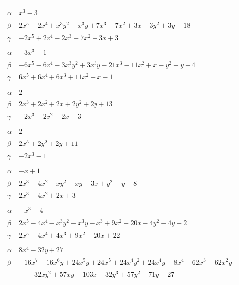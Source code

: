 \documentclass[11pt]{article}
\begin{document}
\begin{longtable}{@{}ll@{}}
\addlinespace[3pt]
\multicolumn{2}{@{}l}{$\{i,j\}=\{2,24\}$, $k_{ij}=2^{2}\cdot 3$}\\
$\alpha$ & $x^{3}-3$\\
$\beta$ & $2x^{5}-2x^{4}+x^{3}y^{2}-x^{3}y+7x^{3}-7x^{2}+3x-3y^{2}+3y-18$\\
$\gamma$ & $-2x^{5}+2x^{4}-2x^{3}+7x^{2}-3x+3$\\
\addlinespace[3pt]
\multicolumn{2}{@{}l}{$\{i,j\}=\{2,37\}$, $k_{ij}=2^{2}$}\\
$\alpha$ & $-3x^{3}-1$\\
$\beta$ & $-6x^{5}-6x^{4}-3x^{3}y^{2}+3x^{3}y-21x^{3}-11x^{2}+x-y^{2}+y-4$\\
$\gamma$ & $6x^{5}+6x^{4}+6x^{3}+11x^{2}-x-1$\\
\addlinespace[3pt]
\multicolumn{2}{@{}l}{$\{i,j\}=\{3,11\}$, $k_{ij}=2\cdot 3^{2}$}\\
$\alpha$ & $2$\\
$\beta$ & $2x^{3}+2x^{2}+2x+2y^{2}+2y+13$\\
$\gamma$ & $-2x^{3}-2x^{2}-2x-3$\\
\addlinespace[3pt]
\multicolumn{2}{@{}l}{$\{i,j\}=\{3,12\}$, $k_{ij}=2^{2}\cdot 3$}\\
$\alpha$ & $2$\\
$\beta$ & $2x^{3}+2y^{2}+2y+11$\\
$\gamma$ & $-2x^{3}-1$\\
\addlinespace[3pt]
\multicolumn{2}{@{}l}{$\{i,j\}=\{3,16\}$, $k_{ij}=3^{2}$}\\
$\alpha$ & $-x+1$\\
$\beta$ & $2x^{3}-4x^{2}-xy^{2}-xy-3x+y^{2}+y+8$\\
$\gamma$ & $2x^{3}-4x^{2}+2x+3$\\
\addlinespace[3pt]
\multicolumn{2}{@{}l}{$\{i,j\}=\{3,28\}$, $k_{ij}=2^{2}\cdot 5$}\\
$\alpha$ & $-x^{3}-4$\\
$\beta$ & $2x^{5}-4x^{4}-x^{3}y^{2}-x^{3}y-x^{3}+9x^{2}-20x-4y^{2}-4y+2$\\
$\gamma$ & $2x^{5}-4x^{4}+4x^{3}+9x^{2}-20x+22$\\
\addlinespace[3pt]
\multicolumn{2}{@{}l}{$\{i,j\}=\{4,14\}$, $k_{ij}=3^{3}$}\\
$\alpha$ & $8x^{4}-32y+27$\\
$\beta$ & $-16x^{7}-16x^{6}y+24x^{5}y+24x^{5}+24x^{4}y^{2}+24x^{4}y-8x^{4}-62x^{3}-62x^{2}y$\\
 & $\quad -32xy^{2}+57xy-103x-32y^{3}+57y^{2}-71y-27$\\

\end{longtable}
\end{document}

